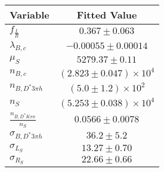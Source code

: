 \begin{tabular}[t]{lc}
\hline
Variable &Fitted Value\\
\hline\hline
$f_{\frac{L}{R}}$&$0.367\pm0.063$\\
\hline
$\lambda_{B,c}$&$-0.00055\pm0.00014$\\
\hline
$\mu_S$&$5279.37\pm0.11$\\
\hline
$n_{B,c}$&$(2.823\pm0.047)\times 10^4$\\
\hline
$n_{B,D^*3\pi h}$&$(5.0\pm1.2)\times 10^2$\\
\hline
$n_S$&$(5.253\pm0.038)\times 10^4$\\
\hline
$\frac{n_{B,D^*K\pi\pi}}{n_S}$&$0.0566\pm0.0078$\\
\hline
$\sigma_{B,D^*3\pi h}$&$36.2\pm5.2$\\
\hline
$\sigma_{L_S}$&$13.27\pm0.70$\\
\hline
$\sigma_{R_S}$&$22.66\pm0.66$\\
\hline
\end{tabular}